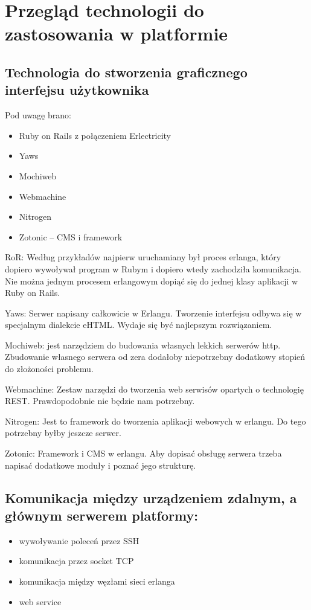 \documentclass[polish,12pt]{aghthesis} \usepackage[utf8]{inputenc}
\begin{document}
\section{Przegląd technologii do zastosowania w platformie}
\subsection{Technologia do stworzenia graficznego interfejsu użytkownika}
Pod uwagę brano:
\begin{itemize}
\item Ruby on Rails z połączeniem Erlectricity
\item Yaws
\item Mochiweb
\item Webmachine
\item Nitrogen
\item Zotonic – CMS i framework
\end{itemize}

RoR: Według przykładów najpierw uruchamiany był proces erlanga, który dopiero wywoływał program w Rubym i dopiero wtedy zachodziła komunikacja. Nie można jednym procesem erlangowym dopiąć się do jednej klasy aplikacji w Ruby on Rails.

Yaws: Serwer napisany całkowicie w Erlangu. Tworzenie interfejsu odbywa się w specjalnym dialekcie eHTML. Wydaje się być najlepszym rozwiązaniem.

Mochiweb: jest narzędziem do budowania własnych lekkich serwerów http. Zbudowanie własnego serwera od zera dodałoby niepotrzebny dodatkowy stopień do złożoności problemu.

Webmachine: Zestaw narzędzi do tworzenia web serwisów opartych o technologię REST. Prawdopodobnie nie będzie nam potrzebny.

Nitrogen: Jest to framework do tworzenia aplikacji webowych w erlangu. Do tego potrzebny byłby jeszcze serwer.

Zotonic: Framework i CMS w erlangu. Aby dopisać obsługę serwera trzeba napisać dodatkowe moduły i poznać jego strukturę.

\subsection{Komunikacja między urządzeniem zdalnym, a głównym serwerem platformy:}
\begin{itemize}
\item wywoływanie poleceń przez SSH
\item komunikacja przez socket TCP
\item komunikacja między węzłami sieci erlanga
\item web service
\end{itemize}
\end{document}

